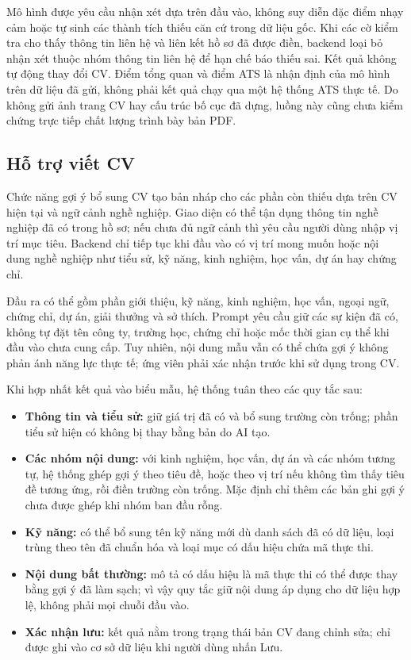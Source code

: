 Mô hình được yêu cầu nhận xét dựa trên đầu vào, không suy diễn đặc điểm nhạy cảm hoặc tự sinh các thành tích thiếu căn cứ trong dữ liệu gốc. Khi các cờ kiểm tra cho thấy thông tin liên hệ và liên kết hồ sơ đã được điền, backend loại bỏ nhận xét thuộc nhóm thông tin liên hệ để hạn chế báo thiếu sai. Kết quả không tự động thay đổi CV. Điểm tổng quan và điểm ATS là nhận định của mô hình trên dữ liệu đã gửi, không phải kết quả chạy qua một hệ thống ATS thực tế. Do không gửi ảnh trang CV hay cấu trúc bố cục đã dựng, luồng này cũng chưa kiểm chứng trực tiếp chất lượng trình bày bản PDF.

\subsection{Hỗ trợ viết CV}

Chức năng gợi ý bổ sung CV tạo bản nháp cho các phần còn thiếu dựa trên CV hiện tại và ngữ cảnh nghề nghiệp. Giao diện có thể tận dụng thông tin nghề nghiệp đã có trong hồ sơ; nếu chưa đủ ngữ cảnh thì yêu cầu người dùng nhập vị trí mục tiêu. Backend chỉ tiếp tục khi đầu vào có vị trí mong muốn hoặc nội dung nghề nghiệp như tiểu sử, kỹ năng, kinh nghiệm, học vấn, dự án hay chứng chỉ.

Đầu ra có thể gồm phần giới thiệu, kỹ năng, kinh nghiệm, học vấn, ngoại ngữ, chứng chỉ, dự án, giải thưởng và sở thích. Prompt yêu cầu giữ các sự kiện đã có, không tự đặt tên công ty, trường học, chứng chỉ hoặc mốc thời gian cụ thể khi đầu vào chưa cung cấp. Tuy nhiên, nội dung mẫu vẫn có thể chứa gợi ý không phản ánh năng lực thực tế; ứng viên phải xác nhận trước khi sử dụng trong CV.

Khi hợp nhất kết quả vào biểu mẫu, hệ thống tuân theo các quy tắc sau:

\begin{itemize}
    \item \textbf{Thông tin và tiểu sử:} giữ giá trị đã có và bổ sung trường còn trống; phần tiểu sử hiện có không bị thay bằng bản do AI tạo.
    \item \textbf{Các nhóm nội dung:} với kinh nghiệm, học vấn, dự án và các nhóm tương tự, hệ thống ghép gợi ý theo tiêu đề, hoặc theo vị trí nếu không tìm thấy tiêu đề tương ứng, rồi điền trường còn trống. Mặc định chỉ thêm các bản ghi gợi ý chưa được ghép khi nhóm ban đầu rỗng.
    \item \textbf{Kỹ năng:} có thể bổ sung tên kỹ năng mới dù danh sách đã có dữ liệu, loại trùng theo tên đã chuẩn hóa và loại mục có dấu hiệu chứa mã thực thi.
    \item \textbf{Nội dung bất thường:} mô tả có dấu hiệu là mã thực thi có thể được thay bằng gợi ý đã làm sạch; vì vậy quy tắc giữ nội dung áp dụng cho dữ liệu hợp lệ, không phải mọi chuỗi đầu vào.
    \item \textbf{Xác nhận lưu:} kết quả nằm trong trạng thái bản CV đang chỉnh sửa; chỉ được ghi vào cơ sở dữ liệu khi người dùng nhấn Lưu.
\end{itemize}

